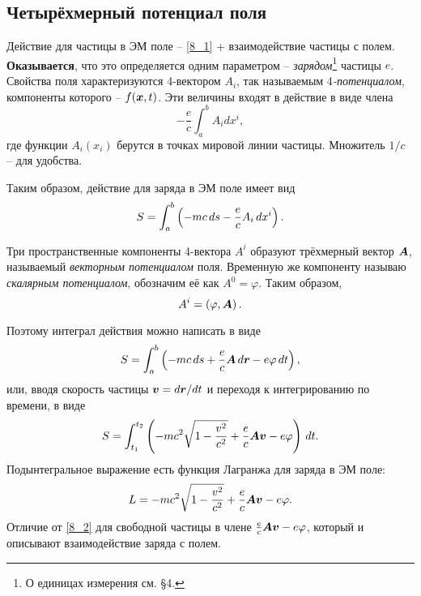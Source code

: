 \subsection{Четырёхмерный потенциал поля}




Действие для частицы в ЭМ поле -- \eqref{8_1} + взаимодействие частицы с полем. \textbf{Оказывается}, что это определяется одним параметром -- \textit{зарядом}\footnote{
    О единицах измерения см. \S 4.
} частицы $e$. Свойства поля характеризуются 4-вектором $A_i$, так называемым 4\textit{-потенциалом}, компоненты которого -- $f(\mbox{\boldmath $x$}, t)$. Эти величины входят в действие в виде члена
$$
    - \frac{e}{c} \int_{a}^{b} A_i dx^i,
$$
где функции $A_i(x_i)$ берутся в точках мировой линии частицы. Множитель $1/c$ -- для удобства. 

Таким образом, действие для заряда в ЭМ поле имеет вид
\begin{equation}
    S = \int_{a}^{b} \left(
        -mc \, d s - \frac{e}{c} A_i \, d x^i
    \right).
\end{equation}

\begin{to_def} 
     Три пространственные компоненты 4-вектора $A^i$ образуют трёхмерный вектор $\mbox{\boldmath $A$}$, называемый \textit{векторным потенциалом} поля. Временную же компоненту называю \textit{скалярным потенциалом}, обозначим её как $A^0 = \varphi$. Таким образом,
    \begin{equation}
        A^i = \left(\varphi, \mbox{\boldmath $A$} \right).
    \end{equation}
\end{to_def}

Поэтому интеграл действия можно написать в виде
$$
    S = \int_{a}^{b} \left(-mc \, d s + \frac{e}{c} \mbox{\boldmath $A$} \, d \mbox{\boldmath $r$} - e \varphi \, d t\right),
$$
или, вводя скорость частицы $\mbox{\boldmath $v$} = d \mbox{\boldmath $r$} / dt$ и переходя к интегрированию по времени, в виде
\begin{equation}
    S = \int_{t_1}^{t_2} \left(
    - mc^2 \sqrt{1 - \frac{v^2}{c^2} } + \frac{e}{c}  \mbox{\boldmath $A$} \mbox{\boldmath $v$} - e \varphi
    \right) \, d t.
\end{equation}
Подынтегральное выражение есть функция Лагранжа для заряда в ЭМ поле:
\begin{equation}
\label{16_4}
    L = - mc^2\sqrt{1 - \frac{v^2}{c^2} } + \frac{e}{c} \mbox{\boldmath $A$} \mbox{\boldmath $v$} - e \varphi.
\end{equation}
Отличие от \eqref{8_2} для свободной частицы в члене $\frac{e}{c} \mbox{\boldmath $A$} \mbox{\boldmath $v$} - e \varphi$, который и описывают взаимодействие заряда с полем.


